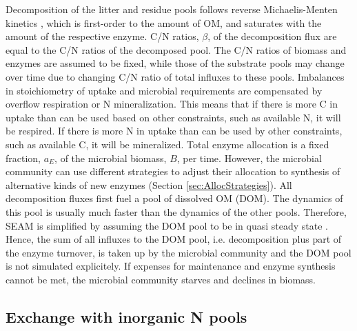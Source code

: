 Decomposition of the litter and residue pools follows reverse
Michaelis-Menten kinetics \citep{Schimel03}, which is first-order to the amount
of OM, and saturates with the amount of the respective enzyme. C/N ratios,
$\beta$, of the decomposition flux are equal to the C/N ratios of the decomposed
pool. The C/N ratios of biomass and enzymes are assumed to be fixed, while those
of the substrate pools may change over time due to changing C/N ratio of total
influxes to these pools. Imbalances in stoichiometry of uptake and microbial
requirements are compensated by overflow respiration or N mineralization. This
means that if there is more C in uptake than can be used based on other
constraints, such as available N, it will be respired. If there is more N in
uptake than can be used by other constraints, such as available C, it will be
mineralized.
Total enzyme allocation is a fixed fraction, $a_E$, of the microbial biomass,
$B$, per time. However, the microbial community can use different strategies to
adjust their allocation to synthesis of alternative kinds of new enzymes
(Section \ref{sec:AllocStrategies}).
All decomposition fluxes first fuel a pool of dissolved OM (DOM). The dynamics
of this pool is usually much faster than the dynamics of the other pools.
Therefore, SEAM is simplified by assuming the DOM pool to be in quasi steady
state \citep{Wutzler13}. Hence, the sum of all influxes to the DOM pool, i.e.
decomposition plus part of the enzyme turnover, is taken up by the microbial
community and the DOM pool is not simulated explicitely.
If expenses for maintenance and enzyme synthesis cannot be met, the microbial
community starves and declines in biomass.

\subsection{Exchange with inorganic N pools}


